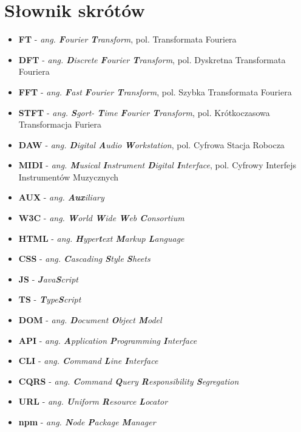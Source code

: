\documentclass[12pt,a4paper,twoside]{mwart}
\begin{document}
\section{Słownik skrótów}
\begin{itemize}
  \item \textbf{FT} - \textit{ang. \textbf{F}ourier \textbf{T}ransform}, pol. Transformata Fouriera
  \item \textbf{DFT} - \textit{ang. \textbf{D}iscrete \textbf{F}ourier \textbf{T}ransform}, pol. Dyskretna Transformata Fouriera
  \item \textbf{FFT} - \textit{ang. \textbf{F}ast \textbf{F}ourier \textbf{T}ransform}, pol. Szybka Transformata Fouriera
  \item \textbf{STFT} - \textit{ang. \textbf{S}gort- \textbf{T}ime \textbf{F}ourier \textbf{T}ransform}, pol. Krótkoczasowa Transformacja Furiera
  \item \textbf{DAW} - \textit{ang. \textbf{D}igital \textbf{A}udio \textbf{W}orkstation}, pol. Cyfrowa Stacja Robocza 
  \item \textbf{MIDI} - \textit{ang. \textbf{M}usical \textbf{I}nstrument \textbf{D}igital \textbf{I}nterface}, pol. Cyfrowy Interfejs Instrumentów Muzycznych
  \item \textbf{AUX} - \textit{ang. \textbf{Aux}iliary}
  \item \textbf{W3C} - \textit{ang. \textbf{W}orld \textbf{W}ide \textbf{W}eb \textbf{C}onsortium}
  \item \textbf{HTML} - \textit{ang. \textbf{H}yper\textbf{t}ext \textbf{M}arkup \textbf{L}anguage}
  \item \textbf{CSS} - \textit{ang.  \textbf{C}ascading \textbf{S}tyle \textbf{S}heets}
  \item \textbf{JS} - \textit{\textbf{J}ava\textbf{S}cript}
  \item \textbf{TS} - \textit{\textbf{T}ype\textbf{S}cript}
  \item \textbf{DOM} - \textit{ang. \textbf{D}ocument \textbf{O}bject \textbf{M}odel}
  \item \textbf{API} - \textit{ang. \textbf{A}pplication \textbf{P}rogramming \textbf{I}nterface}
  \item \textbf{CLI} - \textit{ang. \textbf{C}ommand \textbf{L}ine \textbf{I}nterface}
  \item \textbf{CQRS} - \textit{ang. \textbf{C}ommand \textbf{Q}uery \textbf{R}esponsibility \textbf{S}egregation}
  \item \textbf{URL} - \textit{ang. \textbf{U}niform \textbf{R}esource \textbf{L}ocator }
  \item \textbf{npm} - \textit{ang. \textbf{N}ode \textbf{P}ackage \textbf{M}anager}

\end{itemize}
\newpage
\setcounter{secnumdepth}{2}
\end{document}
